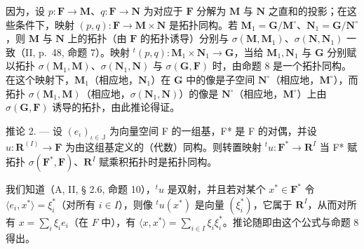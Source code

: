 因为，设 \(p: \mathbf{F} \to \mathbf{M}\)、\(q: \mathbf{F} \to \mathbf{N}\) 为对应于 \(\mathbf{F}\) 分解为 \(\mathbf{M}\) 与 \(\mathbf{N}\) 之直和的投影；在这些条件下，映射 \((p, q): \mathbf{F} \to \mathbf{M} \times \mathbf{N}\) 是拓扑同构。若 \(\mathbf{M}_1 = \mathbf{G} / \mathbf{M}^\circ\)、\(\mathbf{N}_1 = \mathbf{G} / \mathbf{N}^\circ\)，则 \(\mathbf{M}\) 与 \(\mathbf{N}\) 上的拓扑（由 \(\mathbf{F}\) 的拓扑诱导）分别与 \(\sigma(\mathbf{M}, \mathbf{M}_1)\)、\(\sigma(\mathbf{N}, \mathbf{N}_1)\) 一致（II, p.~48, 命题 7）。映射 \(^t(p, q): \mathbf{M}_1 \times \mathbf{N}_1 \to \mathbf{G}\)，当给 \(\mathbf{M}_1, \mathbf{N}_1\) 与 \(\mathbf{G}\) 分别赋以拓扑 \(\sigma(\mathbf{M}_1, \mathbf{M})\)、\(\sigma(\mathbf{N}_1, \mathbf{N})\) 与 \(\sigma(\mathbf{G}, \mathbf{F})\) 时，由命题 8 是一个拓扑同构。在这个映射下，\(\mathbf{M}_1\)（相应地，\(\mathbf{N}_1\)）在 \(\mathbf{G}\) 中的像是子空间 \(\mathbf{N}^\circ\)（相应地，\(\mathbf{M}^\circ\)），而拓扑 \(\sigma(\mathbf{M}_1, \mathbf{M})\)（相应地，\(\sigma(\mathbf{N}_1, \mathbf{N})\)）的像是 \(\mathbf{N}^\circ\)（相应地，\(\mathbf{M}^\circ\)）上由 \(\sigma(\mathbf{G}, \mathbf{F})\) 诱导的拓扑，由此推论得证。

推论 2. --- 设 \((e_{\iota})_{\iota \in \mathbb{J}}\) 为向量空间 F 的一组基，F* 是 F 的对偶，并设 \(u: \mathbf{R}^{(I)} \to \mathbf{F}\) 为由这组基定义的（代数）同构。则转置映射 \({}^t u: \mathbf{F}^* \to \mathbf{R}^I\) 当 F* 赋拓扑 \(\sigma(\mathbf{F}^*, \mathbf{F})\)、\(\mathbf{R}^I\) 赋乘积拓扑时是拓扑同构。

我们知道（A, II, § 2.6, 命题 10），\({}^t u\) 是双射，并且若对某个 \(x^* \in \mathbf{F}^*\) 令 \(\langle e_i, x^* \rangle = \xi_i^*\)（对所有 \(i \in I\)），则像 \({}^t u(x^*)\) 是向量 \((\xi_i^*)\)，它属于 \(\mathbf{R}^I\)，从而对所有 \(x = \sum_{i} \xi_i e_i\)（在 \(F\) 中），有 \(\langle x, x^* \rangle = \sum_{i \in I} \xi_i \xi_i^*\)。推论随即由这个公式与命题 8 得出。

